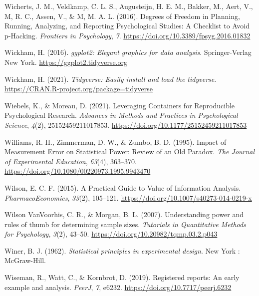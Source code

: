 \documentclass[
  oneside]{krantz}
\newlength{\cslhangindent}
\newlength{\cslentryspacingunit} %
\newenvironment{CSLReferences}[2] %
 {%
  \setlength{\parindent}{0pt}
  \ifodd #1
  \let\oldpar\par
  \def\par{\hangindent=\cslhangindent\oldpar}
  \fi
  \setlength{\parskip}{#2\cslentryspacingunit}
 }%
 {}
\begin{document}
\begin{CSLReferences}{1}{0}
\leavevmode{}%
Wicherts, J. M., Veldkamp, C. L. S., Augusteijn, H. E. M., Bakker, M.,
Aert, V., M, R. C., Assen, V., \& M, M. A. L. (2016). Degrees of
{Freedom} in {Planning}, {Running}, {Analyzing}, and {Reporting
Psychological Studies}: {A Checklist} to {Avoid} p-{Hacking}.
\emph{Frontiers in Psychology}, \emph{7}.
\url{https://doi.org/10.3389/fpsyg.2016.01832}

\leavevmode{}%
Wickham, H. (2016). \emph{ggplot2: Elegant graphics for data analysis}.
Springer-Verlag New York. \url{https://ggplot2.tidyverse.org}

\leavevmode{}%
Wickham, H. (2021). \emph{Tidyverse: Easily install and load the
tidyverse}. \url{https://CRAN.R-project.org/package=tidyverse}

\leavevmode{}%
Wiebels, K., \& Moreau, D. (2021). Leveraging {Containers} for
{Reproducible Psychological Research}. \emph{Advances in Methods and
Practices in Psychological Science}, \emph{4}(2), 25152459211017853.
\url{https://doi.org/10.1177/25152459211017853}

\leavevmode{}%
Williams, R. H., Zimmerman, D. W., \& Zumbo, B. D. (1995). Impact of
{Measurement Error} on {Statistical Power}: {Review} of an {Old
Paradox}. \emph{The Journal of Experimental Education}, \emph{63}(4),
363--370. \url{https://doi.org/10.1080/00220973.1995.9943470}

\leavevmode{}%
Wilson, E. C. F. (2015). A {Practical Guide} to {Value} of {Information
Analysis}. \emph{PharmacoEconomics}, \emph{33}(2), 105--121.
\url{https://doi.org/10.1007/s40273-014-0219-x}

\leavevmode{}%
Wilson VanVoorhis, C. R., \& Morgan, B. L. (2007). Understanding power
and rules of thumb for determining sample sizes. \emph{Tutorials in
Quantitative Methods for Psychology}, \emph{3}(2), 43--50.
\url{https://doi.org/10.20982/tqmp.03.2.p043}

\leavevmode{}%
Winer, B. J. (1962). \emph{Statistical principles in experimental
design}. {New York : McGraw-Hill}.

\leavevmode{}%
Wiseman, R., Watt, C., \& Kornbrot, D. (2019). Registered reports: An
early example and analysis. \emph{PeerJ}, \emph{7}, e6232.
\url{https://doi.org/10.7717/peerj.6232}


\end{CSLReferences}
\end{document}
